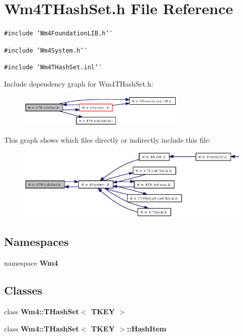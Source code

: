 \section{Wm4THash\-Set.h File Reference}
\label{Wm4THashSet_8h}
{\tt \#include \char`\"{}Wm4Foundation\-LIB.h\char`\"{}}\par
{\tt \#include \char`\"{}Wm4System.h\char`\"{}}\par
{\tt \#include \char`\"{}Wm4THash\-Set.inl\char`\"{}}\par


Include dependency graph for Wm4THash\-Set.h:\begin{figure}[H]
\begin{center}
\leavevmode
\includegraphics[width=226pt]{Wm4THashSet_8h__incl}
\end{center}
\end{figure}


This graph shows which files directly or indirectly include this file:\begin{figure}[H]
\begin{center}
\leavevmode
\includegraphics[width=353pt]{Wm4THashSet_8h__dep__incl}
\end{center}
\end{figure}
\subsection*{Namespaces}
\begin{CompactItemize}
\item 
namespace {\bf Wm4}
\end{CompactItemize}
\subsection*{Classes}
\begin{CompactItemize}
\item 
class {\bf Wm4::THash\-Set$<$ TKEY $>$}
\item 
class \textbf{Wm4::THash\-Set$<$ TKEY $>$::Hash\-Item}
\end{CompactItemize}
